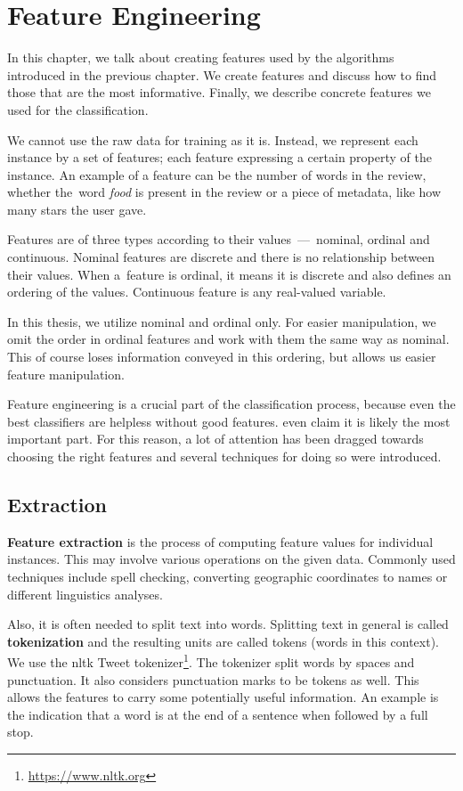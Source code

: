 \chapter{Feature Engineering} \label{chap:fea}

In this chapter, we talk about creating features used by the algorithms
introduced in the previous chapter.
We create features and discuss how to find those that are the most informative.
Finally, we describe concrete features we used for the classification.

We cannot use the raw data for training as it is.
Instead, we represent each instance by a set of features;
each feature expressing a certain property of the instance.
An example of a feature can be the number of words in the review,
whether the~word {\it food} is present in the review
or a piece of metadata, like how many stars the user gave.

Features are of three types according to their values~---~nominal, ordinal and continuous.
Nominal features are discrete and there is no relationship between their values.
When a~feature is ordinal, it means it is discrete and also defines an ordering of the values.
Continuous feature is any real-valued variable.

In this thesis, we utilize nominal and ordinal only.
For easier manipulation,
we omit the order in ordinal features and work with them the same way as nominal.
This of course loses information conveyed in this ordering,
but allows us easier feature manipulation.

Feature engineering is a crucial part of the classification process,
because even the best classifiers are helpless without good features.
\citet{liu2012feature} even claim it is likely the most important part.
For this reason, a lot of attention has been dragged towards choosing the right features
and several techniques for doing so were introduced.



\section{Extraction}

\textbf{Feature extraction} is the process of computing feature values for individual instances.
This may involve various operations on the given data.
Commonly used techniques include spell checking, converting geographic coordinates to names
or different linguistics analyses.

Also, it is often needed to split text into words.
Splitting text in general is called {\bf tokenization} and
the resulting units are called tokens (words in this context).
We use the nltk Tweet tokenizer\footnote{\url{https://www.nltk.org}}.
The tokenizer split words by spaces and punctuation.
It also considers punctuation marks to be tokens as well.
This allows the features to carry some potentially useful information.
An example is the indication that a word is at the end of a sentence when followed by a full stop.


